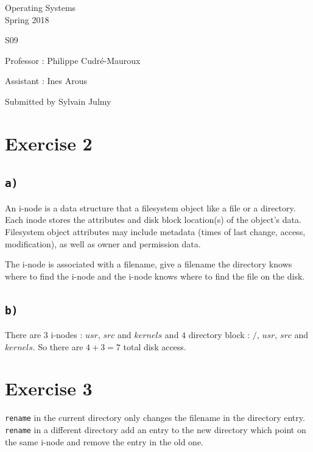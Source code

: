 \documentclass[a4paper,11pt]{report}
\author{Sylvain Julmy}
\date{\today}
\begin{document}
\begin{center}
  \Large{
    Operating Systems\\
    Spring 2018
  }
  
  \noindent\makebox[\linewidth]{\rule{\linewidth}{0.4pt}}
  S09
  \noindent\makebox[\linewidth]{\rule{\linewidth}{0.4pt}}
  \begin{flushleft}
    Professor : Philippe Cudré-Mauroux

    Assistant : Ines Arous
  \end{flushleft}
  
  \noindent\makebox[\linewidth]{\rule{\linewidth}{0.4pt}}

  Submitted by Sylvain Julmy
  
  \noindent\makebox[\linewidth]{\rule{\textwidth}{1pt}}
\end{center}

\section*{Exercise 2}

\subsection*{\texttt{a)}}

An i-node is a data structure that a filesystem object like a file or a
directory. Each inode stores the attributes and disk block location(s) of the
object's data. Filesystem object attributes may include metadata (times of last
change, access, modification), as well as owner and permission data.

The i-node is associated with a filename, give a filename the directory knows
where to find the i-node and the i-node knows where to find the file on the disk.

\subsection*{\texttt{b)}}

There are $3$ i-nodes : $usr$, $src$ and $kernels$ and $4$ directory block :
$/$, $usr$, $src$ and $kernels$. So there are $4 + 3 = 7$ total disk access.

\section*{Exercise 3}

\verb+rename+ in the current directory only changes the filename in the
directory entry. \verb+rename+ in a different directory add an entry to the new
directory which point on the same i-node and remove the entry in the old one.
\end{document}

